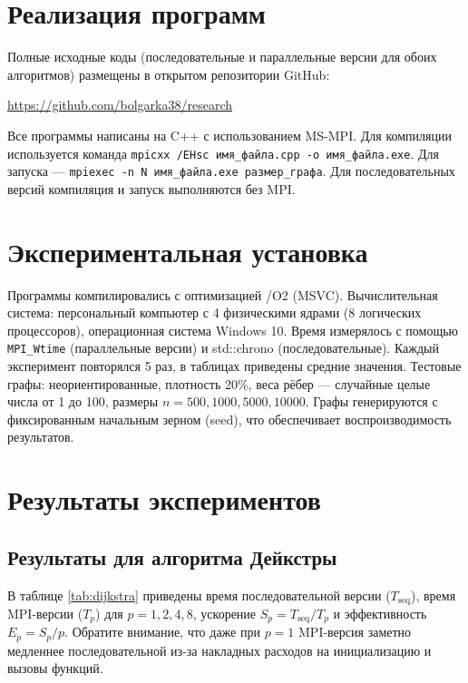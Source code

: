 \documentclass[14pt,a4paper]{article}
\begin{document}
\section{Реализация программ}
Полные исходные коды (последовательные и параллельные версии для обоих алгоритмов) размещены в открытом репозитории GitHub:

\url{https://github.com/bolgarka38/research}


Все программы написаны на C++ с использованием MS-MPI. Для компиляции используется команда \texttt{mpicxx /EHsc имя\_файла.cpp -o имя\_файла.exe}. Для запуска — \texttt{mpiexec -n N имя\_файла.exe размер\_графа}. Для последовательных версий компиляция и запуск выполняются без MPI.

\section{Экспериментальная установка}
Программы компилировались с оптимизацией /O2 (MSVC). Вычислительная система: персональный компьютер с 4 физическими ядрами (8 логических процессоров), операционная система Windows 10. Время измерялось с помощью \texttt{MPI\_Wtime} (параллельные версии) и std::chrono (последовательные). Каждый эксперимент повторялся 5 раз, в таблицах приведены средние значения. Тестовые графы: неориентированные, плотность 20\%, веса рёбер — случайные целые числа от 1 до 100, размеры $n = 500, 1000, 5000, 10000$. Графы генерируются с фиксированным начальным зерном (seed), что обеспечивает воспроизводимость результатов.

\section{Результаты экспериментов}
\subsection{Результаты для алгоритма Дейкстры}
В таблице \ref{tab:dijkstra} приведены время последовательной версии ($T_{\text{seq}}$), время MPI-версии ($T_p$) для $p = 1,2,4,8$, ускорение $S_p = T_{\text{seq}} / T_p$ и эффективность $E_p = S_p / p$. Обратите внимание, что даже при $p=1$ MPI-версия заметно медленнее последовательной из-за накладных расходов на инициализацию и вызовы функций.
\end{document}
